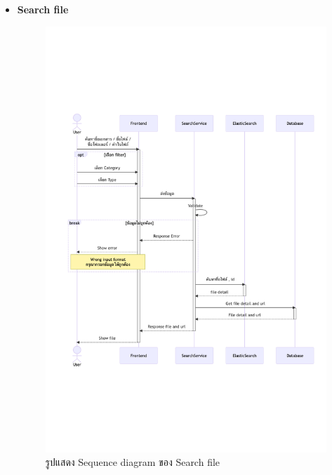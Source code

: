 \documentclass[12pt,oneside,openright,a4paper]{cpe-thai-project}
\begin{document}
\begin{itemize}
    \newpage
    \item \textbf{Search file} \\
    \begin{figure}[!ht]\centering
        \includegraphics[width=13cm, trim={0 7cm 0 7cm},clip]{./assets/sequence-diagram/search-file.png}
        \caption{รูปแสดง Sequence diagram ของ Search file}\label{fig:sqSearchFile}
    \end{figure}


\end{itemize}
\end{document}
